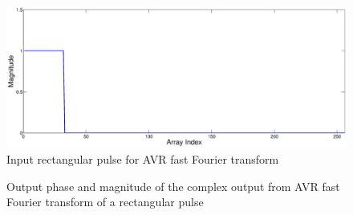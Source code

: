 \begin{figure}
\includegraphics[width=\textwidth]{./Figures/AVR_FFT_Square_Input.eps}
\caption{Input rectangular pulse for AVR fast Fourier transform}
\label{fig:AVR:FFT:Square:Input}
\end{figure}
\begin{figure}
\caption{Output phase and magnitude of the complex output from AVR fast Fourier transform of a rectangular pulse}
\label{fig:AVR:FFT:Square:Output}
\end{figure}
